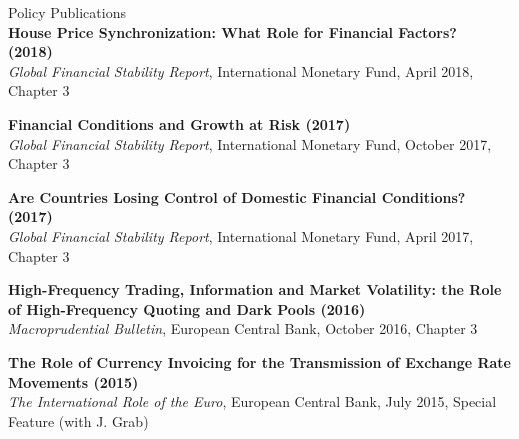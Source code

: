 \documentclass[usegeometry, 10pt, a4paper]{cv} %
\newcommand{\activite}[1]{\textbf{#1}\ }
\begin{document}
\begin{rubriquetableau}[0.95\textwidth]{Policy Publications}\\
  

\activite{House Price Synchronization: What Role for Financial Factors? (2018)} \\
\hspace{0.6cm} \small{\emph{Global Financial Stability Report}, International Monetary Fund, April
  2018, Chapter 3}
\vspace{0.4cm} 


\activite{Financial Conditions and Growth at Risk (2017)} \\
\hspace{0.6cm} \small{\emph{Global Financial Stability Report}, International Monetary Fund, October
  2017, Chapter 3}
\vspace{0.4cm} 


\activite{Are Countries Losing Control of Domestic Financial Conditions? (2017)} \\
\hspace{0.6cm} \small{\emph{Global Financial Stability Report}, International Monetary Fund, April
  2017, Chapter 3}
\vspace{0.4cm} 


\activite{High-Frequency Trading, Information and Market Volatility: the Role of High-Frequency
  Quoting and Dark Pools (2016)} \\
\hspace{0.6cm} \small{\emph{Macroprudential Bulletin}, European Central Bank, October 2016, Chapter 3}
\vspace{0.4cm} 


\activite{The Role of Currency Invoicing for the Transmission of Exchange Rate Movements (2015)} \\
\hspace{0.6cm} \small{\emph{The International Role of the Euro}, European Central Bank, July 2015, Special Feature (with J. Grab)}
\end{rubriquetableau}


\newpage


\end{document}
